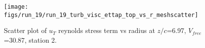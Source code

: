 \begin{figure}[H]
\centering
\texttt{[image: figs/run\_19/run\_19\_turb\_visc\_ettap\_top\_vs\_r\_meshscatter]}
\caption{Scatter plot of $
u_T$ reynolds stress term vs radius at $z/c$=6.97, $V_{free}$=30.87, station 2.}
\label{fig:run_19_turb_visc_ettap_top_vs_r_meshscatter}
\end{figure}


